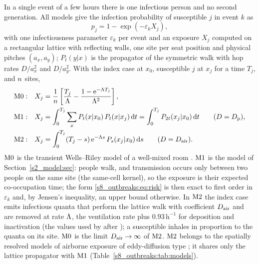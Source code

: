 In a single event of a few hours there is one infectious person and no second generation. All models give the
infection probability of susceptible $j$ in event $k$ as
\begin{equation}\label{s8_outbreaks:eq:risk}
  p_j = 1-\exp(-\varepsilon_k X_j),
\end{equation}
with one infectiousness parameter $\varepsilon_k$ per event and an exposure $X_j$ computed on a rectangular
lattice with reflecting walls, one site per seat position and physical pitches $(a_x,a_y)$; $P_t(y|x)$ is the
propagator of the symmetric walk with hop rates $D/a_x^2$ and $D/a_y^2$. With the index case at $x_0$,
susceptible $j$ at $x_j$ for a time $T_j$, and $n$ sites,
\begin{align}
  \mathrm{M0}:&\quad X_j=\frac{1}{n}\left[\frac{T_j}{\Lambda}-\frac{1-\mathrm{e}^{-\Lambda T_j}}{\Lambda^{2}}\right],
     \label{s8_outbreaks:eq:m0}\\
  \mathrm{M1}:&\quad X_j=\int_0^{T_j}\sum_{x}P_t(x|x_0)\,P_t(x|x_j)\,\mathrm{d} t=\int_0^{T_j}P_{2t}(x_j|x_0)\,\mathrm{d} t
     \qquad(D=D_{\mathrm{p}}),\label{s8_outbreaks:eq:m1}\\
  \mathrm{M2}:&\quad X_j=\int_0^{T_j}(T_j-s)\,\mathrm{e}^{-\Lambda s}\,P_s(x_j|x_0)\,\mathrm{d} s\qquad(D=D_{\mathrm{air}}).
     \label{s8_outbreaks:eq:m2}
\end{align}
$\mathrm{M0}$ is the transient Wells--Riley model of a well-mixed room \citep{wells1955airborne,riley1978,
gammaitoni1997using}. $\mathrm{M1}$ is the model of Section~\ref{s2_model:sec}: people walk, and transmission occurs
only between two people on the same site (the same-cell kernel), so the exposure is their expected
co-occupation time; the form \eqref{s8_outbreaks:eq:risk} is then exact to first order in $\varepsilon_k$ and,
by Jensen's inequality, an upper bound otherwise. In $\mathrm{M2}$ the index case emits infectious quanta that perform
the lattice walk with coefficient $D_{\mathrm{air}}$ and are removed at rate $\Lambda$, the ventilation rate plus
$0.93\,\mathrm{h}^{-1}$ for deposition and inactivation (the values used by \citet{ou2022} after
\citet{miller2021}); a susceptible inhales in proportion to the quanta on its site. $\mathrm{M0}$ is the limit
$D_{\mathrm{air}}\to\infty$ of $\mathrm{M2}$. $\mathrm{M2}$ belongs to the spatially resolved models of airborne exposure of eddy-diffusion
type \citep{cheng2011modeling,venkatram2021modeling,lau2022predicting}; it shares only the lattice propagator with
$\mathrm{M1}$ (Table~\ref{s8_outbreaks:tab:models}).

